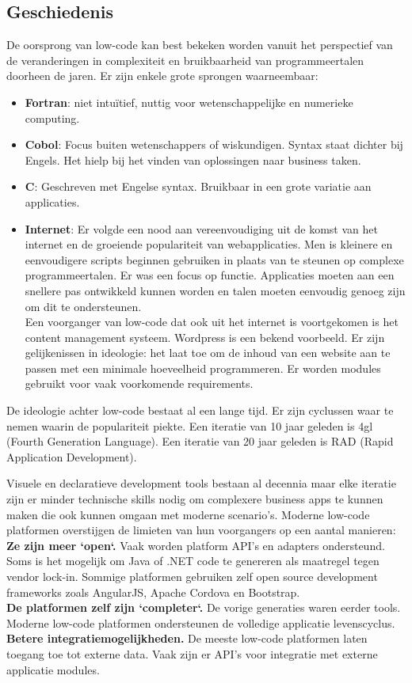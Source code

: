 \subsection{Geschiedenis}

De oorsprong van low-code kan best bekeken worden vanuit het perspectief van de veranderingen in complexiteit en bruikbaarheid van programmeertalen doorheen de jaren. Er zijn enkele grote sprongen waarneembaar:
\begin{itemize}
    \item \textbf{Fortran}: niet intuïtief, nuttig voor wetenschappelijke en numerieke computing.
    \item \textbf{Cobol}: Focus buiten wetenschappers of wiskundigen. Syntax staat dichter bij Engels. Het hielp bij het vinden van oplossingen naar business taken.
    \item \textbf{C}: Geschreven met Engelse syntax. Bruikbaar in een grote variatie aan applicaties.
    \item \textbf{Internet}: Er volgde een nood aan vereenvoudiging uit de komst van het internet en de groeiende populariteit van webapplicaties. Men is kleinere en eenvoudigere scripts beginnen gebruiken in plaats van te steunen op complexe programmeertalen. Er was een focus op functie. Applicaties moeten aan een snellere pas ontwikkeld kunnen worden en talen moeten eenvoudig genoeg zijn om dit te ondersteunen.\\
    Een voorganger van low-code dat ook uit het internet is voortgekomen is het content management systeem. Wordpress is een bekend voorbeeld. Er zijn gelijkenissen in ideologie: het laat toe om de inhoud van een website aan te passen met een minimale hoeveelheid programmeren. Er worden modules gebruikt voor vaak voorkomende requirements. \autocite{Kissflow2018}
\end{itemize} \autocite{Kissflow2018a}

De ideologie achter low-code bestaat al een lange tijd. Er zijn cyclussen waar te nemen waarin de populariteit piekte. Een iteratie van 10 jaar geleden is 4gl (Fourth Generation Language). Een iteratie van 20 jaar geleden is RAD (Rapid Application Development). %

Visuele en declaratieve development tools bestaan al decennia maar elke iteratie zijn er minder technische skills nodig om complexere business apps te kunnen maken die ook kunnen omgaan met moderne scenario's. Moderne low-code platformen overstijgen de limieten van hun voorgangers op een aantal manieren: \\
\textbf{Ze zijn meer `open`.} Vaak worden platform API's en adapters ondersteund. Soms is het mogelijk om Java of .NET code te genereren als maatregel tegen vendor lock-in. Sommige platformen gebruiken zelf open source development frameworks zoals AngularJS, Apache Cordova en Bootstrap.\\
\textbf{De platformen zelf zijn `completer`.} De vorige generaties waren eerder tools. Moderne low-code platformen ondersteunen de volledige applicatie levenscyclus.\\
\textbf{Betere integratiemogelijkheden.} De meeste low-code platformen laten toegang toe tot externe data. Vaak zijn er API's voor integratie met externe applicatie modules. 


